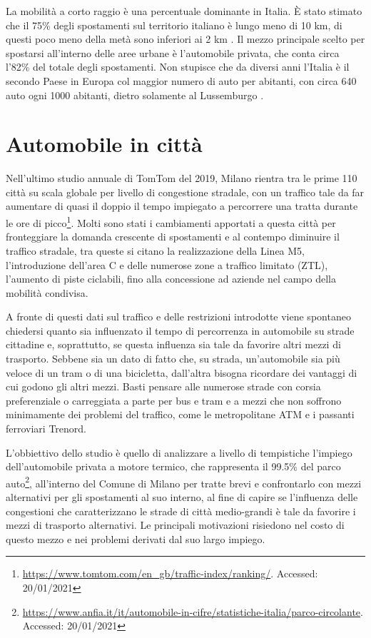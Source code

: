 La mobilità a corto raggio è una percentuale dominante in Italia. È stato stimato che il 75\% degli spostamenti sul territorio italiano è lungo meno di 10 km, di questi poco meno della metà sono inferiori ai 2 km \cite{isfortaudimob}. Il mezzo principale scelto per spostarsi all'interno delle aree urbane è l'automobile privata, che conta circa l'82\% del totale degli spostamenti. Non stupisce che da diversi anni l'Italia è il secondo Paese in Europa col maggior numero di auto per abitanti, con circa 640 auto ogni 1000 abitanti, dietro solamente al Lussemburgo \cite{eurostatcars}.

\section{Automobile in città}

Nell'ultimo studio annuale di TomTom del 2019, Milano rientra tra le prime 110 città su scala globale per livello di congestione stradale, con un traffico tale da far aumentare di quasi il doppio il tempo impiegato a percorrere una tratta durante le ore di picco\footnote{\url{https://www.tomtom.com/en_gb/traffic-index/ranking/}. Accessed: 20/01/2021}. Molti sono stati i cambiamenti apportati a questa città per fronteggiare la domanda crescente di spostamenti e al contempo diminuire il traffico stradale, tra queste si citano la realizzazione della Linea M5, l'introduzione dell'area C e delle numerose zone a traffico limitato (ZTL), l'aumento di piste ciclabili, fino alla concessione ad aziende nel campo della mobilità condivisa.

A fronte di questi dati sul traffico e delle restrizioni introdotte viene spontaneo chiedersi quanto sia influenzato il tempo di percorrenza in automobile su strade cittadine e, soprattutto, se questa influenza sia tale da favorire altri mezzi di trasporto. Sebbene sia un dato di fatto che, su strada, un'automobile sia più veloce di un tram o di una bicicletta, dall'altra bisogna ricordare dei vantaggi di cui godono gli altri mezzi. Basti pensare alle numerose strade con corsia preferenziale o carreggiata a parte per bus e tram e a mezzi che non soffrono minimamente dei problemi del traffico, come le metropolitane ATM e i passanti ferroviari Trenord.

L'obbiettivo dello studio è quello di analizzare a livello di tempistiche l'impiego dell'automobile privata a motore termico, che rappresenta il 99.5\% del parco auto\footnote{\label{footanfia}\url{https://www.anfia.it/it/automobile-in-cifre/statistiche-italia/parco-circolante}. Accessed: 20/01/2021}, all'interno del Comune di Milano per tratte brevi e confrontarlo con mezzi alternativi per gli spostamenti al suo interno, al fine di capire se l'influenza delle congestioni che caratterizzano le strade di città medio-grandi è tale da favorire i mezzi di trasporto alternativi. Le principali motivazioni risiedono nel costo di questo mezzo e nei problemi derivati dal suo largo impiego.

